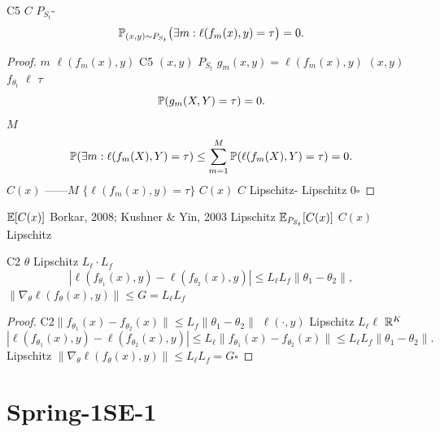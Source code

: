 \begin{lemma}[Lipschitz-]\label{lem:lae}
 C5 $C$  $P_{S_t}$-
\begin{equation}
    \mathbb{P}_{(x,y) \sim P_{S_t}}\bigl(\exists m: \ell(f_m(x), y) = \tau\bigr) = 0.
\end{equation}
\end{lemma}

\begin{proof}
 $m$ $\ell(f_m(x), y)$  C5 $(x, y)$  $P_{S_t}$  $g_m(x, y) = \ell(f_m(x), y)$  $(x, y)$  $f_{\theta_t}$  $\ell$  $\tau$ 
\begin{equation}
    \mathbb{P}(g_m(X, Y) = \tau) = 0.
\end{equation}
 $M$ 
\begin{equation}
    \mathbb{P}(\exists m: \ell(f_m(X), Y) = \tau) \leq \sum_{m=1}^M \mathbb{P}(\ell(f_m(X), Y) = \tau) = 0.
\end{equation}
$C(x)$ ——$M$  $\{\ell(f_m(x), y) = \tau\}$ $C(x)$  $C$  Lipschitz- Lipschitz  0\hfill $\square$
\end{proof}

\textbf{} $\mathbb{E}[C(x)]$ Borkar, 2008; Kushner \& Yin, 2003 Lipschitz  $\mathbb{E}_{P_{S_t}}[C(x)]$  $C(x)$  Lipschitz 

\begin{lemma}[Lipschitz ]\label{lem:comp}
 C2  $\theta$ Lipschitz  $L_\ell \cdot L_f$
\begin{equation}
    |\ell(f_{\theta_1}(x), y) - \ell(f_{\theta_2}(x), y)| \leq L_\ell L_f \|\theta_1 - \theta_2\|,
\end{equation}
$\|\nabla_\theta \ell(f_\theta(x), y)\| \leq G = L_\ell L_f$
\end{lemma}

\begin{proof}
 C2$\|f_{\theta_1}(x) - f_{\theta_2}(x)\| \leq L_f \|\theta_1 - \theta_2\|$ $\ell(\cdot, y)$  Lipschitz  $L_\ell$$\ell$  $\mathbb{R}^K$ 
\begin{equation}
    |\ell(f_{\theta_1}(x), y) - \ell(f_{\theta_2}(x), y)| \leq L_\ell \|f_{\theta_1}(x) - f_{\theta_2}(x)\| \leq L_\ell L_f \|\theta_1 - \theta_2\|.
\end{equation}
 Lipschitz $\|\nabla_\theta \ell(f_\theta(x), y)\| \leq L_\ell L_f = G$\hfill $\square$
\end{proof}

\section{ Spring-1SE-1}\label{sec:spring1}

